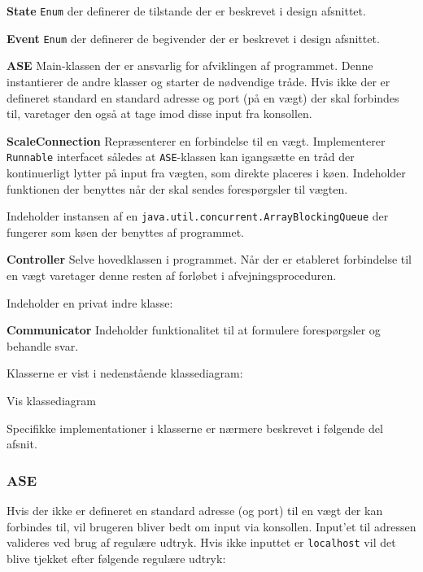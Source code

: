 \documentclass[a4paper]{article}
\newenvironment{my_itemize}
{\begin{itemize}
  \setlength{\itemsep}{1pt}
  \setlength{\parskip}{0pt}
  \setlength{\parsep}{0pt}}
{\end{itemize}}
\begin{document}
\begin{my_itemize}
  \item \textbf{State} \texttt{Enum} der definerer de tilstande der er beskrevet i design afsnittet.
  \item \textbf{Event} \texttt{Enum} der definerer de begivender der er beskrevet i design afsnittet.
  \item \textbf{ASE} Main-klassen der er ansvarlig for afviklingen af programmet. Denne instantierer de andre klasser og starter de nødvendige tråde. Hvis ikke der er defineret standard en standard adresse og port (på en vægt) der skal forbindes til, varetager den også at tage imod disse input fra konsollen.
  \item \textbf{ScaleConnection} Repræsenterer en forbindelse til en vægt. Implementerer \texttt{Runnable} interfacet således at \texttt{ASE}-klassen kan igangsætte en tråd der kontinuerligt lytter på input fra vægten, som direkte placeres i køen. Indeholder funktionen der benyttes når der skal sendes forespørgsler til vægten.

    Indeholder instansen af en \texttt{java.util.concurrent.ArrayBlockingQueue} der fungerer som køen der benyttes af programmet.
  \item \textbf{Controller} Selve hovedklassen i programmet. Når der er etableret forbindelse til en vægt varetager denne resten af forløbet i afvejningsproceduren.

    Indeholder en privat indre klasse:
    \begin{my_itemize}
      \item \textbf{Communicator} Indeholder funktionalitet til at formulere forespørgsler og behandle svar.
    \end{my_itemize}
\end{my_itemize}

Klasserne er vist i nedenstående klassediagram:

\begin{center}
  Vis klassediagram
\end{center}

Specifikke implementationer i klasserne er nærmere beskrevet i følgende del afsnit.

\subsubsection{ASE} %

Hvis der ikke er defineret en standard adresse (og port) til en vægt der kan forbindes til, vil brugeren bliver bedt om input via konsollen. Input'et til adressen valideres ved brug af regulære udtryk. Hvis ikke inputtet er \texttt{localhost} vil det blive tjekket efter følgende regulære udtryk:
\end{document}
